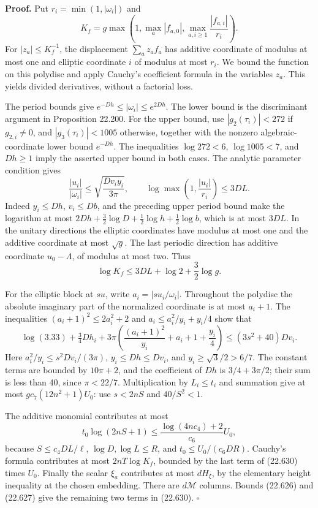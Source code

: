 \documentclass[
  11pt,
  a4paper,
]{article}
\begin{document}
\textbf{Proof.} Put \(r_i=\min(1,|\omega_i|)\) and \[
 K_f=g\max\left(1,\max_a|f_{a,0}|,
                 \max_{a,i\ge1}\frac{|f_{a,i}|}{r_i}\right).
 \tag{22.631}
\] For \(|z_a|\le K_f^{-1}\), the displacement \(\sum_a z_af_a\) has
additive coordinate of modulus at most one and elliptic coordinate \(i\)
of modulus at most \(r_i\). We bound the function on this polydisc and
apply Cauchy's coefficient formula in the variables \(z_a\). This yields
divided derivatives, without a factorial loss.

The period bounds give \(e^{-Dh}\le|\omega_i|\le e^{2Dh}\). The lower
bound is the discriminant argument in Proposition 22.200. For the upper
bound, use \(|g_2(\tau_i)|<272\) if \(g_{2,i}\ne0\), and
\(|g_3(\tau_i)|<1005\) otherwise, together with the nonzero
algebraic-coordinate lower bound \(e^{-Dh}\). The inequalities
\(\log272<6\), \(\log1005<7\), and \(Dh\ge1\) imply the asserted upper
bound in both cases. The analytic parameter condition gives \[
 \frac{|u_i|}{|\omega_i|}
 \le\sqrt{\frac{Dv_i y_i}{3\pi}},\qquad
 \log\max\left(1,\frac{|u_i|}{r_i}\right)\le3DL.
 \tag{22.632}
\] Indeed \(y_i\le Dh\), \(v_i\le Db\), and the preceding upper period
bound make the logarithm at most
\(2Dh+\tfrac32\log D+\tfrac12\log h+\tfrac12\log b\), which is at most
\(3DL\). In the unitary directions the elliptic coordinates have modulus
at most one and the additive coordinate at most \(\sqrt g\). The last
periodic direction has additive coordinate \(u_0-\Lambda\), of modulus
at most two. Thus \[
 \log K_f\le3DL+\log2+\frac32\log g.
 \tag{22.633}
\]

For the elliptic block at \(su\), write \(a_i=|s u_i/\omega_i|\).
Throughout the polydisc the absolute imaginary part of the normalized
coordinate is at most \(a_i+1\). The inequalities
\((a_i+1)^2\le2a_i^2+2\) and \(a_i\le a_i^2/y_i+y_i/4\) show that \[
 \log(3.33)+\tfrac34Dh_i+
  3\pi\left(\frac{(a_i+1)^2}{y_i}+a_i+1+\frac{y_i}{4}\right)
 \le (3s^2+40)Dv_i.
 \tag{22.634}
\] Here \(a_i^2/y_i\le s^2Dv_i/(3\pi)\), \(y_i\le Dh\le Dv_i\), and
\(y_i\ge\sqrt3/2>6/7\). The constant terms are bounded by \(10\pi+2\),
and the coefficient of \(Dh\) is \(3/4+3\pi/2\); their sum is less than
40, since \(\pi<22/7\). Multiplication by \(L_i\le t_i\) and summation
give at most \(g c_7(12n^2+1)U_0\): use \(s<2nS\) and \(40/S^2<1\).

The additive monomial contributes at most \[
 t_0\log(2nS+1)
 \le\frac{\log(4nc_4)+2}{c_6}U_0,
 \tag{22.635}
\] because \(S\le c_4DL/\ell\), \(\log D,\log L\le R\), and
\(t_0\le U_0/(c_6DR)\). Cauchy's formula contributes at most
\(2nT\log K_f\), bounded by the last term of (22.630) times \(U_0\).
Finally the scalar \(\xi_a\) contributes at most \(dH_\xi\), by the
elementary height inequality at the chosen embedding. There are
\(d\mathcal M\) columns. Bounds (22.626) and (22.627) give the remaining
two terms in (22.630). \(\square\)
\end{document}
